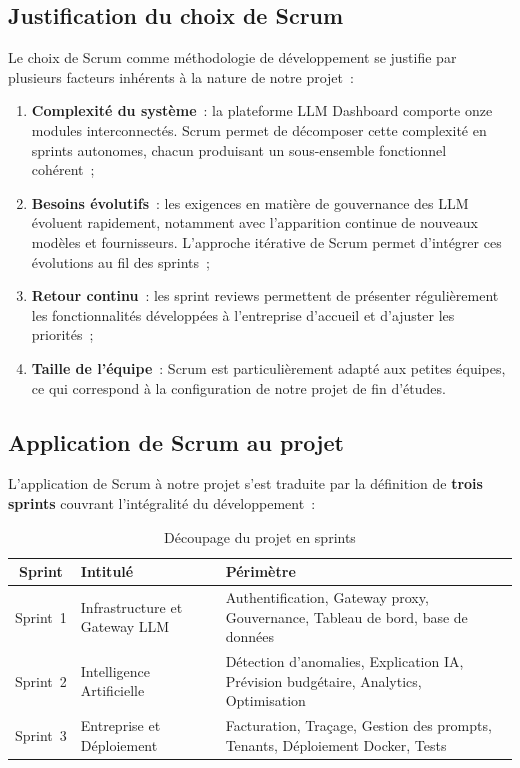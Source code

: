 \subsection{Justification du choix de Scrum}

Le choix de Scrum comme méthodologie de développement se justifie par plusieurs facteurs inhérents à la nature de notre projet~:

\begin{enumerate}[noitemsep]
    \item \textbf{Complexité du système}~: la plateforme LLM Dashboard comporte onze modules interconnectés. Scrum permet de décomposer cette complexité en sprints autonomes, chacun produisant un sous-ensemble fonctionnel cohérent~;
    \item \textbf{Besoins évolutifs}~: les exigences en matière de gouvernance des LLM évoluent rapidement, notamment avec l'apparition continue de nouveaux modèles et fournisseurs. L'approche itérative de Scrum permet d'intégrer ces évolutions au fil des sprints~;
    \item \textbf{Retour continu}~: les sprint reviews permettent de présenter régulièrement les fonctionnalités développées à l'entreprise d'accueil et d'ajuster les priorités~;
    \item \textbf{Taille de l'équipe}~: Scrum est particulièrement adapté aux petites équipes, ce qui correspond à la configuration de notre projet de fin d'études.
\end{enumerate}

\subsection{Application de Scrum au projet}

L'application de Scrum à notre projet s'est traduite par la définition de \textbf{trois sprints} couvrant l'intégralité du développement~:

\begin{table}[H]
\centering
\caption{Découpage du projet en sprints}
\label{tab:sprints}
\begin{tabularx}{\textwidth}{|c|l|X|}
\hline
\textbf{Sprint} & \textbf{Intitulé} & \textbf{Périmètre} \\
\hline
Sprint~1 & Infrastructure et Gateway LLM & Authentification, Gateway proxy, Gouvernance, Tableau de bord, base de données \\
\hline
Sprint~2 & Intelligence Artificielle & Détection d'anomalies, Explication IA, Prévision budgétaire, Analytics, Optimisation \\
\hline
Sprint~3 & Entreprise et Déploiement & Facturation, Traçage, Gestion des prompts, Tenants, Déploiement Docker, Tests \\
\hline
\end{tabularx}
\end{table}


